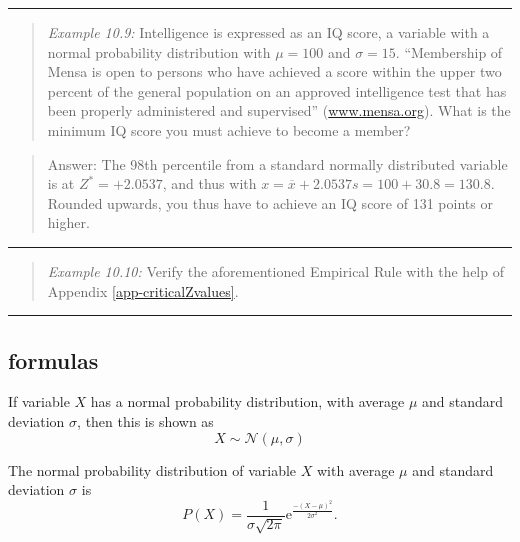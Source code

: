 \documentclass[
]{book}
\begin{document}
\begin{center}\rule{0.5\linewidth}{0.5pt}\end{center}

\begin{quote}
\emph{Example 10.9:}
Intelligence is expressed as an IQ score, a variable with a normal
probability distribution with \(\mu=100\) and \(\sigma=15\). ``Membership of Mensa
is open to persons who have achieved a score within the upper two
percent of the general population on an approved intelligence test that
has been properly administered and supervised''
(\url{www.mensa.org}). What is the minimum IQ score you must
achieve to become a member?
\end{quote}

\begin{quote}
Answer: The 98th percentile from a standard normally distributed
variable is at \(Z^*=+2.0537\), and thus with
\(x=\overline{x}+2.0537 s = 100+30.8 = 130.8\). Rounded upwards, you thus
have to achieve an IQ score of 131 points or higher.
\end{quote}

\begin{center}\rule{0.5\linewidth}{0.5pt}\end{center}

\begin{quote}
\emph{Example 10.10:}
Verify the aforementioned Empirical Rule with the help of
Appendix \ref{app-criticalZvalues}.
\end{quote}

\begin{center}\rule{0.5\linewidth}{0.5pt}\end{center}

\subsection{formulas}\label{formulas-1}

If variable \(X\) has a normal probability distribution, with average \(\mu\)
and standard deviation \(\sigma\), then this is shown as
\begin{equation}
  X \sim \mathcal{N}(\mu,\sigma)
  \label{eq:normallydistributed}
\end{equation}

The normal probability distribution of variable \(X\) with average \(\mu\) and
standard deviation \(\sigma\) is
\begin{equation}
  P(X) = \frac{1}{\sigma \sqrt{2\pi}} \mbox{e}^{ \frac{-(X-\mu)^2}{2\sigma^2} }.
  \label{eq:prob-normal}
\end{equation}
\end{document}
